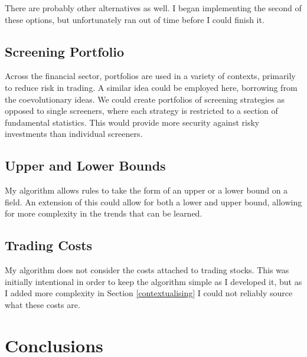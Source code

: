 \noindent There are probably other alternatives as well. I began implementing the second of these options, but unfortunately ran out of time before I could finish it.

\subsection{Screening Portfolio}
Across the financial sector, portfolios are used in a variety of contexts, primarily to reduce risk in trading. A similar idea could be employed here, borrowing from the coevolutionary ideas. We could create portfolios of screening strategies as opposed to single screeners, where each strategy is restricted to a section of fundamental statistics. This would provide more security against risky investments than individual screeners.

\subsection{Upper and Lower Bounds}
My algorithm allows rules to take the form of an upper or a lower bound on a field. An extension of this could allow for both a lower and upper bound, allowing for more complexity in the trends that can be learned.

\subsection{Trading Costs}
My algorithm does not consider the costs attached to trading stocks. This was initially intentional in order to keep the algorithm simple as I developed it, but as I added more complexity in Section \ref{contextualising} I could not reliably source what these costs are.

\section{Conclusions}
